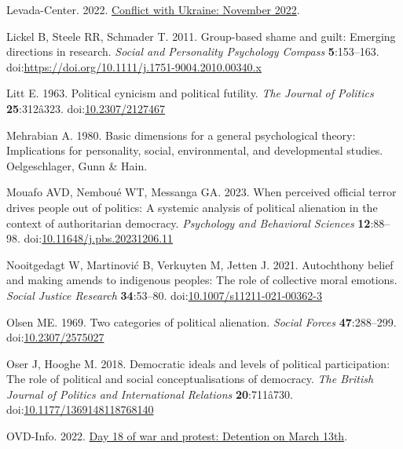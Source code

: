 \documentclass[
]{article}
\newlength{\cslhangindent}
\newenvironment{CSLReferences}[2] %
 {\begin{list}{}{%
  \setlength{\itemindent}{0pt}
  \setlength{\leftmargin}{0pt}
  \setlength{\parsep}{0pt}
  \ifodd #1
   \setlength{\leftmargin}{\cslhangindent}
   \setlength{\itemindent}{-1\cslhangindent}
  \fi
  \setlength{\itemsep}{#2\baselineskip}}}
 {\end{list}}
\begin{document}
\begin{CSLReferences}{1}{0}
Levada-Center. 2022. \href{https://www.levada.ru/en/2022/12/12/conflict-with-ukraine-november-2022/}{Conflict with {Ukraine: November} 2022}.

Lickel B, Steele RR, Schmader T. 2011. Group-based shame and guilt: Emerging directions in research. \emph{Social and Personality Psychology Compass} \textbf{5}:153--163. doi:\url{https://doi.org/10.1111/j.1751-9004.2010.00340.x}

Litt E. 1963. Political cynicism and political futility. \emph{The Journal of Politics} \textbf{25}:312â323. doi:\href{https://doi.org/10.2307/2127467}{10.2307/2127467}

Mehrabian A. 1980. Basic dimensions for a general psychological theory: Implications for personality, social, environmental, and developmental studies. Oelgeschlager, Gunn \& Hain.

Mouafo AVD, Nemboué WT, Messanga GA. 2023. When perceived official terror drives people out of politics: A systemic analysis of political alienation in the context of authoritarian democracy. \emph{Psychology and Behavioral Sciences} \textbf{12}:88--98. doi:\href{https://doi.org/10.11648/j.pbs.20231206.11}{10.11648/j.pbs.20231206.11}

Nooitgedagt W, Martinović B, Verkuyten M, Jetten J. 2021. Autochthony belief and making amends to indigenous peoples: The role of collective moral emotions. \emph{Social Justice Research} \textbf{34}:53--80. doi:\href{https://doi.org/10.1007/s11211-021-00362-3}{10.1007/s11211-021-00362-3}

Olsen ME. 1969. Two categories of political alienation. \emph{Social Forces} \textbf{47}:288--299. doi:\href{https://doi.org/10.2307/2575027}{10.2307/2575027}

Oser J, Hooghe M. 2018. Democratic ideals and levels of political participation: The role of political and social conceptualisations of democracy. \emph{The British Journal of Politics and International Relations} \textbf{20}:711â730. doi:\href{https://doi.org/10.1177/1369148118768140}{10.1177/1369148118768140}

OVD-Info. 2022. \href{https://en.ovdinfo.org/day-18-war-and-protest-detention-march-13th}{Day 18 of war and protest: Detention on {March} 13th}.


\end{CSLReferences}
\end{document}
